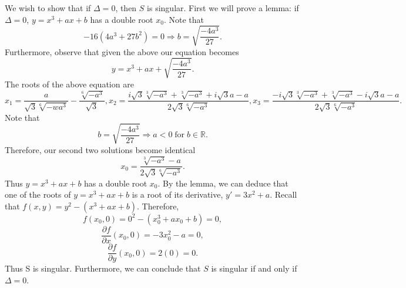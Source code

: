 \documentclass{article}
\DeclareMathOperator{\for}{for}
\begin{document}
\indent We wish to show that if $\Delta=0$, then $S$ is singular. First we will prove a lemma: if $\Delta=0$, $y=x^3+ax+b$ has a double root $x_0$. Note that
$$-16(4a^3+27b^2)=0 \Longrightarrow b = \sqrt{\frac{-4a^3}{27}}.$$
Furthermore, observe that given the above our equation becomes
$$y=x^3+ax+\sqrt{\frac{-4a^3}{27}}.$$
The roots of the above equation are
$$x_1=\frac{a}{\sqrt{3}\sqrt[6]{-wa^3}}-\frac{\sqrt[6]{-a^3}}{\sqrt{3}}, x_2=\frac{i\sqrt{3}\sqrt[3]{-a^3}+\sqrt[3]{-a^3}+i\sqrt{3}a-a}{2\sqrt{3}\sqrt[6]{-a^3}}, x_3=\frac{-i\sqrt{3}\sqrt[3]{-a^3}+\sqrt[3]{-a^3}-i\sqrt{3}a-a}{2\sqrt{3}\sqrt[6]{-a^3}}.$$
Note that
$$b=\sqrt{\frac{-4a^3}{27}} \Longrightarrow a<0 \for b \in \mathbb{R}.$$
Therefore, our second two solutions become identical
$$x_0=\frac{\sqrt[3]{-a^3}-a}{2\sqrt{3}\sqrt[6]{-a^3}}.$$
Thus $y=x^3+ax+b$ has a double root $x_0$.
By the lemma, we can deduce that one of the roots of $y=x^3+ax+b$ is a root of its derivative, $y'=3x^2+a$. Recall that $f(x,y)=y^2-(x^3+ax+b)$. Therefore,
$$f(x_0,0)=0^2-(x_0^3+ax_0+b)=0,$$
$$\frac{\partial f}{\partial x} (x_0,0)=-3x_0^2-a=0,$$
$$\frac{\partial f}{\partial y} (x_0,0)=2(0)=0.$$
Thus S is singular. Furthermore, we can conclude that $S$ is singular if and only if $\Delta=0$. 
\end{document}
